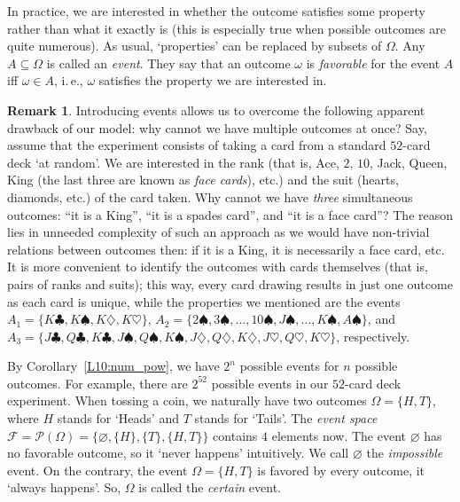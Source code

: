 \documentclass[12pt,notitlepage]{article}
\theoremstyle{plain}
\theoremstyle{definition}
\newtheorem{rem}[thm]{Remark}
\theoremstyle{plain}
\newcommand{\sbs}{\subseteq}
\newcommand{\void}{\varnothing}
\newcommand{\mP}{\mathcal{P}}
\newcommand{\1}{\mathbf{1}}
\newcommand{\0}{\mathbf{0}}
\newcommand{\mF}{\mathcal{F}}
\begin{document}
In practice, we are interested in whether the outcome satisfies some property rather than what it exactly is (this is especially true when possible outcomes are quite numerous). As usual, `properties' can be replaced by subsets of $\Omega$. Any $A \sbs \Omega$ is called an \emph{event}. They say that an outcome $\omega$ is \emph{favorable} for the event $A$ iff $\omega \in A$, i.\,e., $\omega$ satisfies the property we are interested in.

\begin{rem}
Introducing events allows us to overcome the following apparent drawback of our model: why cannot we have multiple outcomes at once? Say, assume that the experiment consists of taking a card from a standard $52$-card deck `at random'. We are interested in the rank (that is, Ace, $2$, $10$, Jack, Queen, King (the last three are known as \emph{face cards}), etc.) and the suit (hearts, diamonds, etc.) of the card taken. Why cannot we have \emph{three} simultaneous outcomes: ``it is a King'', ``it is a spades card'', and ``it is a face card''? The reason lies in unneeded complexity of such an approach as we would have non-trivial relations between outcomes then: if it is a King, it is necessarily a face card, etc. It is more convenient to identify the outcomes with cards themselves (that is, pairs of ranks and suits); this way, every card drawing results in just one outcome as each card is unique, while the properties we mentioned are the events $A_1 = \{K\clubsuit, K\spadesuit, K\diamondsuit, K\heartsuit\}$, $A_2 = \{2\spadesuit, 3\spadesuit, \ldots, 10\spadesuit, J\spadesuit, \ldots, K\spadesuit, A\spadesuit \}$, and $A_3 = \{J\clubsuit, Q\clubsuit, K\clubsuit, J\spadesuit, Q\spadesuit, K\spadesuit, J\diamondsuit, Q\diamondsuit, K\diamondsuit, J\heartsuit, Q\heartsuit, K\heartsuit\}$, respectively.
\end{rem}

By Corollary~\ref{L10:num_pow}, we have $2^n$ possible events for $n$ possible outcomes. For example, there are $2^{52}$ possible events in our $52$-card deck experiment. When tossing a coin, we naturally have two outcomes $\Omega = \{H, T\}$, where $H$ stands for `Heads' and $T$ stands for `Tails'. The \emph{event space} $\mF = \mP(\Omega) = \{\void, \{H\}, \{T\}, \{H, T\} \}$ contains $4$ elements now. The event $\void$ has no favorable outcome, so it `never happens' intuitively. We call $\void$ the \emph{impossible} event. On the contrary, the event $\Omega = \{H, T\}$ is favored by every outcome, it `always happens'. So, $\Omega$ is called the \emph{certain} event.
\end{document}
